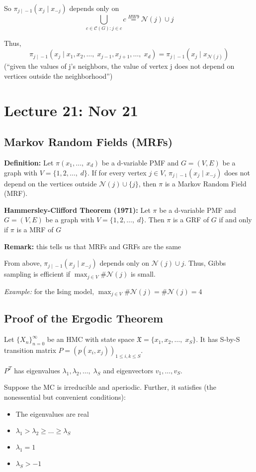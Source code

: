 \documentclass[12pt]{article}
\newcommand{\mfX}{\mathfrak{X}}
\begin{document}
        So $\pi_{j \; | \; -1}(x_j \; | \; x_{-j})$ depends only on 
        \[\bigcup_{c \in \mathcal{C}(G): j \in c} c \overset{HW 9}{=} \mathcal{N}(j) \cup {j}\]

        Thus, 
        \[\pi_{j \; | \; -1}(x_j \; | \; x_1, x_2, \dots,\; x_{j-1}, x_{j+1}, \dots, \; x_d) = \pi_{j \; | \; -1}(x_j \; | \; x_{\mathcal{N}(j)})\]
        (``given the values of j's neighbors, the value of vertex j does not depend on vertices outside the neighborhood'')

\section{Lecture 21: Nov 21}
    \subsection{Markov Random Fields (MRFs)}
        \textbf{Definition:} Let $\pi(x_1, \dots,\; x_d)$ be a d-variable PMF and $G= (V,E)$ be a graph with $V = \{1, 2, \dots,\; d\}$. If for every vertex $j \in V$, $\pi_{j \; | \; -1}(x_j \; | \; x_{-j})$ does not depend on the vertices outside $\mathcal{N}(j) \cup \{j\}$, then $\pi$ is a Markov Random Field (MRF).

        \textbf{Hammersley-Clifford Theorem (1971):} Let $\pi$ be a d-variable PMF and $G = (V, E)$ be a graph with $V = \{1, 2, \dots,\; d\}$. Then $\pi$ is a GRF of $G$ if and only if $\pi$ is a MRF of $G$

        \textbf{Remark:} this tells us that MRFs and GRFs are the same  

        From above, $\pi_{j \; | \; -1}(x_j \; | \; x_{-j})$ depends only on $\mathcal{N}(j) \cup {j}$. Thus, Gibbs sampling is efficient if $\max_{j\in V} \#\mathcal{N}(j)$ is small.

        \emph{Example:} for the Ising model, $\max_{j\in V} \#\mathcal{N}(j) = \#\mathcal{N}(j) = 4$

    \subsection{Proof of the Ergodic Theorem}
        Let $\{X_n\}_{n=0}^\infty$ be an HMC with state space $\mfX = \{x_1, x_2, \dots,\; x_S\}$. It has S-by-S transition matrix $P = (p(x_i, x_j))_{1\leq i, k \leq S}$. 

        $P^T$ has eigenvalues $\lambda_1, \lambda_2, \dots,\; \lambda_S$ and eigenvectors $v_1, \dots, v_S$.

        Suppose the MC is irreducible and aperiodic. Further, it satisfies (the nonessential but convenient conditions):
        \begin{itemize}
            \item The eigenvalues are real 
            \item $\lambda_1 > \lambda_2 \geq \dots \geq \lambda_S$
            \item $\lambda_1 = 1$
            \item $\lambda_S > -1$
        \end{itemize} 
\end{document}
